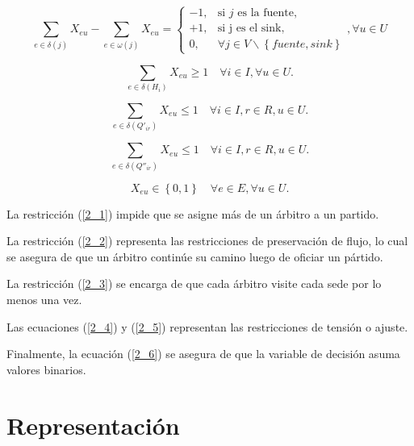 \documentclass[letter, 10pt]{article}
\begin{document}
\begin{equation} \label{2_2}
  \displaystyle\sum_{e \in \delta(j)}X_{eu} - \displaystyle\sum_{e \in \omega(j)} X_{eu} = \begin{cases}
    -1, & \text{si $j$ es la fuente},                          \\
    +1, & \text{si j es el sink},                              \\
    0,  & \forall j \in V\backslash\left\{fuente, sink\right\}
  \end{cases}, \forall u \in U
\end{equation}

\begin{equation} \label{2_3}
  \displaystyle\sum_{e \in \delta(H_i)} X_{eu} \geq 1 \quad\forall i \in I, \forall u \in U.
\end{equation}

\begin{equation} \label{2_4}
  \displaystyle\sum_{e \in \delta(Q'_{ir})} X_{eu} \leq 1 \quad\forall i \in I, r \in R, u \in U.
\end{equation}

\begin{equation} \label{2_5}
  \displaystyle\sum_{e \in \delta(Q''_{ir})} X_{eu} \leq 1 \quad\forall i \in I, r \in R, u \in U.
\end{equation}

\begin{equation} \label{2_6}
  X_{eu} \in \left\{0, 1\right\}\quad\forall e \in E, \forall u \in U.
\end{equation}

La restricci\'on (\ref{2_1}) impide que se asigne m\'as de un \'arbitro a un partido.

La restricci\'on (\ref{2_2}) representa las restricciones de preservaci\'on de flujo, lo cual se asegura de que un \'arbitro contin\'ue su camino luego de oficiar un p\'artido.

La restricci\'on (\ref{2_3}) se encarga de que cada \'arbitro visite cada sede por lo menos una vez.

Las ecuaciones (\ref{2_4}) y (\ref{2_5}) representan las restricciones de tensi\'on o ajuste.

Finalmente, la ecuaci\'on (\ref{2_6}) se asegura de que la variable de decisi\'on asuma valores binarios.

\section{Representaci\'on}
\end{document}
